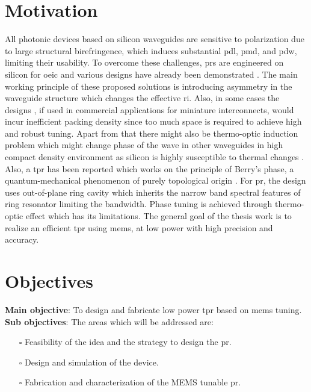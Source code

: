 \documentclass[../report.tex]{subfiles}
\begin{document}
	\section{Motivation} 
All photonic devices based on silicon waveguides are sensitive to polarization due to large structural birefringence, which induces substantial \gls{pdl}, \gls{pmd}, and \gls{pdw}, limiting their usability. To overcome these challenges, \gls{pr}s are engineered on silicon for \gls{oeic} and various designs have already been demonstrated \cite{xie_efficient_2015,velasco_ultracompact_2012,leung_numerical_2011,wang_design_2014,dai_novel_2011,wirth_efficient_2012,chen_compact_2011}. The main working principle of these proposed solutions is introducing asymmetry in the waveguide structure which changes the effective \gls{ri}. Also, in some cases the designs \cite{sarmiento-merenguel_demonstration_2015}, if used in commercial applications for miniature interconnects, would incur inefficient packing density since too much space is required to achieve high and robust tuning. Apart from that there might also be thermo-optic induction problem which might change phase of the wave in other waveguides in high compact density environment as silicon is highly susceptible to thermal changes \cite{ibrahim_athermal_2012}. Also, a \gls{tpr} has been reported which works on the principle of Berry’s phase, a quantum-mechanical phenomenon of purely topological origin \cite{xu_electrically_2014}. For \gls{pr}, the design uses out-of-plane ring cavity which inherits the narrow band spectral features of ring resonator limiting the bandwidth. Phase tuning is achieved through thermo-optic effect which has its limitations. The general goal of the thesis work is to realize an efficient \gls{tpr} using \gls{mems}, at low power with high precision and accuracy.    
	\section{Objectives}
\textbf{Main objective}: To design and fabricate low power \gls{tpr} based on \gls{mems} tuning. \\

\noindent \textbf{Sub objectives}: The areas which will be addressed are:
\begin{itemize}
	\item[$\square$] Feasibility of the idea and the strategy to design the \gls{pr}. 
	\item[$\square$] Design and simulation of the device.
	\item[$\square$] Fabrication and characterization of the MEMS tunable \gls{pr}.
\end{itemize}
	
\end{document}
